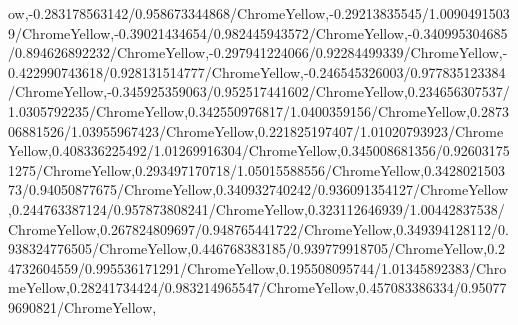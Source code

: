 {\begin{tikzternal}
{ow,-0.283178563142/0.958673344868/ChromeYellow,-0.29213835545/1.00904915039/ChromeYellow,-0.39021434654/0.982445943572/ChromeYellow,-0.340995304685/0.894626892232/ChromeYellow,-0.297941224066/0.92284499339/ChromeYellow,-0.422990743618/0.928131514777/ChromeYellow,-0.246545326003/0.977835123384/ChromeYellow,-0.345925359063/0.952517441602/ChromeYellow,0.234656307537/1.0305792235/ChromeYellow,0.342550976817/1.0400359156/ChromeYellow,0.287306881526/1.03955967423/ChromeYellow,0.221825197407/1.01020793923/ChromeYellow,0.408336225492/1.01269916304/ChromeYellow,0.345008681356/0.926031751275/ChromeYellow,0.293497170718/1.05015588556/ChromeYellow,0.342802150373/0.94050877675/ChromeYellow,0.340932740242/0.936091354127/ChromeYellow,0.244763387124/0.957873808241/ChromeYellow,0.323112646939/1.00442837538/ChromeYellow,0.267824809697/0.948765441722/ChromeYellow,0.349394128112/0.938324776505/ChromeYellow,0.446768383185/0.939779918705/ChromeYellow,0.24732604559/0.995536171291/ChromeYellow,0.195508095744/1.01345892383/ChromeYellow,0.28241734424/0.983214965547/ChromeYellow,0.457083386334/0.950779690821/ChromeYellow,
}
\end{tikzternal}}

